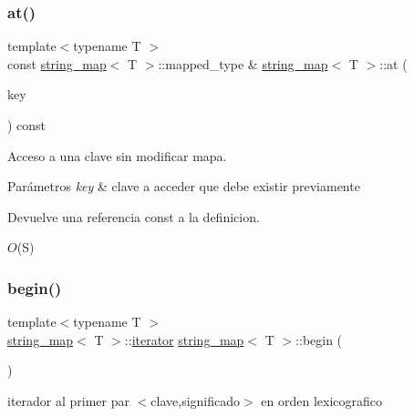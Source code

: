 \subsubsection{\texorpdfstring{at()}{at()}\hspace{0.1cm}{\footnotesize\ttfamily [2/2]}}
{\footnotesize\ttfamily template$<$typename T $>$ \\
const \mbox{\hyperlink{classstring__map}{string\+\_\+map}}$<$ T $>$\+::mapped\+\_\+type \& \mbox{\hyperlink{classstring__map}{string\+\_\+map}}$<$ T $>$\+::at (\begin{DoxyParamCaption}\item[{const key\+\_\+type \&}]{key }\end{DoxyParamCaption}) const}



Acceso a una clave sin modificar mapa. 


\begin{DoxyParams}{Parámetros}
{\em key} & clave a acceder que debe existir previamente \\
\hline
\end{DoxyParams}
\begin{DoxyReturn}{Devuelve}
una referencia const a la definicion.
\end{DoxyReturn}

\begin{DoxyDescription}
\item[Complejidad Temporal]$O$(S)
\end{DoxyDescription}\mbox{\label{classstring__map_aced2bd9493475515f3dc765a379484bd}} 
\subsubsection{\texorpdfstring{begin()}{begin()}}
{\footnotesize\ttfamily template$<$typename T $>$ \\
\mbox{\hyperlink{classstring__map}{string\+\_\+map}}$<$ T $>$\+::\mbox{\hyperlink{classstring__map_1_1iterator}{iterator}} \mbox{\hyperlink{classstring__map}{string\+\_\+map}}$<$ T $>$\+::begin (\begin{DoxyParamCaption}{ }\end{DoxyParamCaption})}



iterador al primer par $<$clave,significado$>$ en orden lexicografico 

